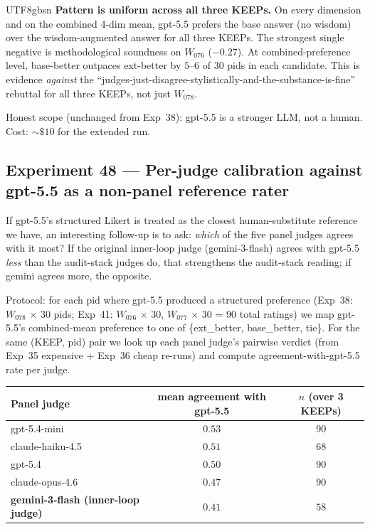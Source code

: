 \documentclass{article}
\begin{document}
\begin{CJK*}{UTF8}{gbsn}
\textbf{Pattern is uniform across all three KEEPs.} On every
dimension and on the combined 4-dim mean, gpt-5.5 prefers the
base answer (no wisdom) over the wisdom-augmented answer for all
three KEEPs. The strongest single negative is methodological
soundness on \(W_{076}\) (\(-0.27\)). At combined-preference
level, base-better outpaces ext-better by \(5\)--\(6\) of \(30\)
pids in each candidate. This is evidence \emph{against} the
``judges-just-disagree-stylistically-and-the-substance-is-fine''
rebuttal for all three KEEPs, not just \(W_{078}\).

Honest scope (unchanged from Exp~38): gpt-5.5 is a stronger LLM,
not a human. Cost: \({\sim}\$10\) for the extended run.

\subsection{Experiment 48 --- Per-judge calibration against
gpt-5.5 as a non-panel reference rater}
\label{sec:exp48}

If gpt-5.5's structured Likert is treated as the closest
human-substitute reference we have, an interesting follow-up is
to ask: \emph{which} of the five panel judges agrees with it
most? If the original inner-loop judge (gemini-3-flash) agrees
with gpt-5.5 \emph{less} than the audit-stack judges do, that
strengthens the audit-stack reading; if gemini agrees more, the
opposite.

Protocol: for each pid where gpt-5.5 produced a structured
preference (Exp~38: \(W_{078}\) \(\times\) 30 pids; Exp~41:
\(W_{076}\) \(\times\) 30, \(W_{077}\) \(\times\) 30 = 90 total
ratings) we map gpt-5.5's combined-mean preference to one of
\{ext\_better, base\_better, tie\}. For the same (KEEP, pid)
pair we look up each panel judge's pairwise verdict (from
Exp~35 expensive + Exp~36 cheap re-runs) and compute
agreement-with-gpt-5.5 rate per judge.

\begin{center}\small
\begin{tabular}{l c c}
  \toprule
  Panel judge & mean agreement with gpt-5.5 & \(n\) (over 3 KEEPs) \\
  \midrule
  gpt-5.4-mini       & \(0.53\) & \(90\) \\
  claude-haiku-4.5   & \(0.51\) & \(68\) \\
  gpt-5.4            & \(0.50\) & \(90\) \\
  claude-opus-4.6    & \(0.47\) & \(90\) \\
  \textbf{gemini-3-flash (inner-loop judge)} & \(\mathbf{0.41}\) & \(58\) \\
  \bottomrule
\end{tabular}
\end{center}


\end{CJK*}
\end{document}
